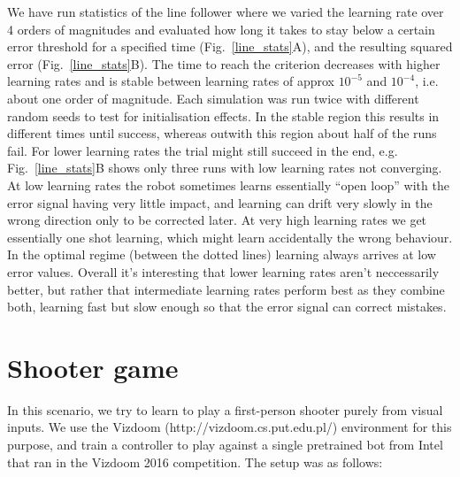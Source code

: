 \documentclass{llncs}
\begin{document}
We have run statistics of the line follower where we varied the
learning rate over 4 orders of magnitudes and evaluated how long it
takes to stay below a certain error threshold for a specified time
(Fig.~\ref{line_stats}A), and the resulting squared error
(Fig.~\ref{line_stats}B). The time to reach the criterion decreases
with higher learning rates and is stable between learning rates of
approx $10^{-5}$ and $10^{-4}$, i.e. about one order of
magnitude. Each simulation was run twice with different random seeds
to test for initialisation effects. In the stable
region this results in different times until success, whereas outwith
this region about half of the runs fail. For lower learning rates the
trial might still succeed in the end, e.g. Fig.~\ref{line_stats}B
shows only three runs with low learning rates not converging. At low
learning rates the robot sometimes learns essentially ``open loop''
with the error signal having very little impact, and learning can
drift very slowly in the wrong direction only to be corrected later.
At very high learning rates we get essentially one shot learning,
which might learn accidentally the wrong behaviour. In the
optimal regime (between the dotted lines) learning always arrives at low
error values. Overall it's interesting that lower learning rates
aren't neccessarily better, but rather that intermediate learning
rates perform best as they combine both, learning fast but slow enough
so that the error signal can correct mistakes.




\section{Shooter game}
In this scenario, we try to learn to play a first-person shooter
purely from visual inputs. We use the Vizdoom
(http://vizdoom.cs.put.edu.pl/) environment for this purpose, and
train a controller to play against a single pretrained bot from Intel
that ran in the Vizdoom 2016 competition. The setup was as follows:
\end{document}
